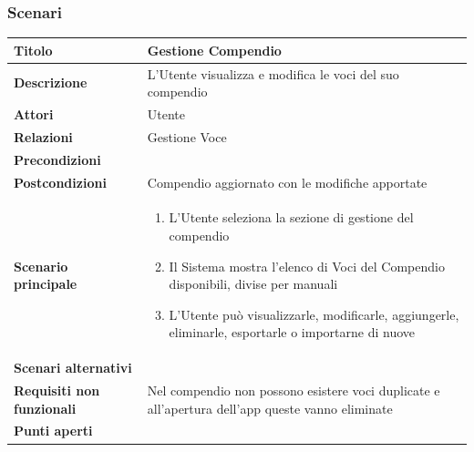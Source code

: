 \documentclass[a4paper, 11pt]{article}
\begin{document}
\subsubsection{Scenari}
\begin{center}

\begin{tabular}{ |p{5cm}|p{9.5cm}|  }
\hline
\textbf{Titolo} & Gestione Compendio \\
\hline
\textbf{Descrizione} & L'Utente visualizza e modifica le voci del suo compendio \\
\hline
\textbf{Attori} & Utente  \\
\hline
\textbf{Relazioni} & Gestione Voce \\
\hline
\textbf{Precondizioni} &  \\
\hline
\textbf{Postcondizioni} & Compendio aggiornato con le modifiche apportate \\
\hline
\textbf{Scenario principale} & 
\begin{enumerate}
    \item L'Utente seleziona la sezione di gestione del compendio
    \item Il Sistema mostra l'elenco di Voci del Compendio disponibili, divise per manuali
    \item L'Utente può visualizzarle, modificarle, aggiungerle, eliminarle, esportarle o importarne di nuove
\end{enumerate}
\\
\hline
\textbf{Scenari alternativi} & \\
\hline
    \textbf{Requisiti non funzionali} & Nel compendio non possono esistere voci duplicate e all’apertura dell’app queste vanno eliminate \\
\hline
\textbf{Punti aperti} &  \\
\hline
\end{tabular}

\vspace{3em}


\end{center}
\end{document}
